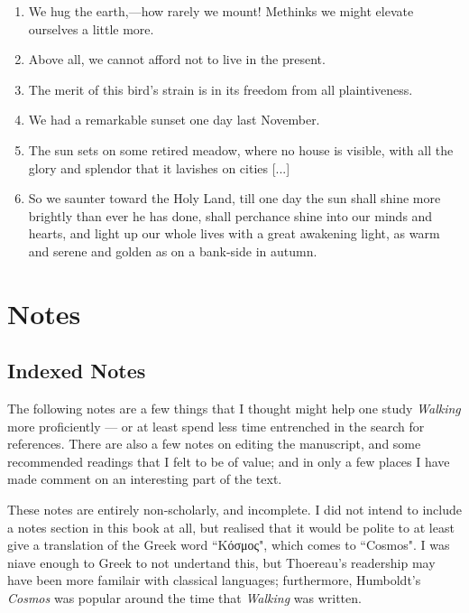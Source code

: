 \documentclass[twoside,openright,10pt]{memoir} %
\begin{document}
\begin{enumerate}
\item We hug the earth,—how rarely we mount! Methinks we might elevate ourselves a little more. \EBGaramond{}\textlangle\normalfont {} \thecount \EBGaramond{}\textrangle \normalfont
\item Above all, we cannot afford not to live in the present. \newline \EBGaramond{}\textlangle\normalfont {} \thecount \EBGaramond{}\textrangle \normalfont
\item The merit of this bird’s strain is in its freedom from all plaintiveness. \EBGaramond{}\textlangle\normalfont {} \thecount \EBGaramond{}\textrangle \normalfont
\item We had a remarkable sunset one day last November. \EBGaramond{}\textlangle\normalfont {} \thecount \EBGaramond{}\textrangle \normalfont
\item The sun sets on some retired meadow, where no house is visible, with all the glory and splendor that it lavishes on cities [...] \EBGaramond{}\textlangle\normalfont {} \thecount \EBGaramond{}\textrangle \normalfont\item So we saunter toward the Holy Land, till one day the sun shall shine more brightly than ever he has done, shall perchance shine into our minds and hearts, and light up our whole lives with a great awakening light, as warm and serene and golden as on a bank-side in autumn. \mbox{\EBGaramond{}\textlangle\normalfont {} \thecount \EBGaramond{}\textrangle \normalfont}
\end{enumerate}

\chapter*{Notes}
\section*{Indexed Notes}
\setlength\parindent{0em}
\setlength\parskip{10pt}
The following notes are a few things that I thought might help one study \emph{Walking} more proficiently — or at least spend less time entrenched in the search for references. There are also a few notes on editing the manuscript, and some recommended readings that I felt to be of value; and in only a few places I have made comment on an interesting part of the text.

These notes are entirely non-scholarly, and incomplete. I did not intend to include a notes section in this book at all, but realised that it would be polite to at least give a translation of the Greek word “\EBGaramond{}Κόσμος\normalfont ", which comes to “Cosmos". I was niave enough to Greek to not undertand this, but Thoereau's readership may have been more familair with classical languages; furthermore, Humboldt's \emph{Cosmos} was popular around the time that \emph{Walking} was written.
\end{document}
